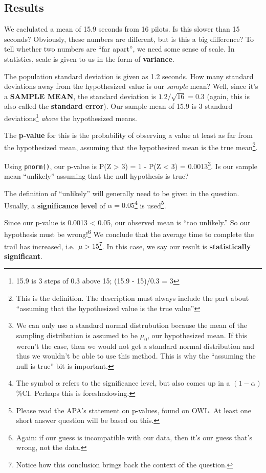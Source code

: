 \documentclass[
  letterpaper,
  DIV=11,
  numbers=noendperiod,
  oneside]{scrreprt}
\begin{document}
\hypertarget{results}{%
\subsection{Results}\label{results}}

We caclulated a mean of 15.9 seconds from 16 pilots. Is this slower than
15 seconds? Obviously, these numbers are different, but is this a big
difference? To tell whether two numbers are ``far apart'', we need some
sense of scale. In statistics, scale is given to us in the form of
\textbf{variance}.

The population standard deviation is given as 1.2 seconds. How many
standard deviations away from the hypothesized value is our
\emph{sample} mean? Well, since it's a \textbf{SAMPLE MEAN}, the
standard deviation is \(1.2/\sqrt{16} = 0.3\) (again, this is also
called the \textbf{standard error}). Our sample mean of 15.9 is 3
standard deviations\footnote{15.9 is 3 steps of 0.3 above 15; (15.9 -
  15)/0.3 = 3} \emph{above} the hypothesized means.

The \textbf{p-value} for this is the probability of observing a value at
least as far from the hypothesized mean, assuming that the hypothesized
mean is the true mean\footnote{This is the definition. The description
  must always include the part about ``assuming that the hypothesized
  value is the true value''}.

Using \texttt{pnorm()}, our p-value is P(Z \textgreater{} 3) = 1 - P(Z
\textless{} 3) = 0.0013\footnote{We can only use a standard normal
  distrubution because the mean of the sampling distribution is assumed
  to be \(\mu_0\), our hypothesized mean. If this weren't the case, then
  we would not get a standard normal distribution and thus we wouldn't
  be able to use this method. This is why the ``assuming the null is
  true'' bit is important.}. Is our sample mean ``unlikely'' assuming
that the null hypothesis is true?

The definition of ``unlikely'' will generally need to be given in the
question. Usually, a \textbf{significance level} of
\(\alpha = 0.05\)\footnote{The symbol \(\alpha\) refers to the
  significance level, but also comes up in a \((1-\alpha)\)\%CI. Perhaps
  this is foreshadowing.} is used\footnote{Please read the APA's
  statement on p-values, found on OWL. At least one short answer
  question will be based on this.}.

Since our p-value is 0.0013 \textless{} 0.05, our observed mean is ``too
unlikely.'' So our hypothesis must be wrong!\footnote{Again: if our
  guess is incompatible with our data, then it's our guess that's wrong,
  not the data.} We conclude that the average time to complete the trail
has increased, i.e.~\(\mu > 15\)\footnote{Notice how this conclusion
  brings back the context of the question.}. In this case, we say our
result is \textbf{statistically significant}.
\end{document}
